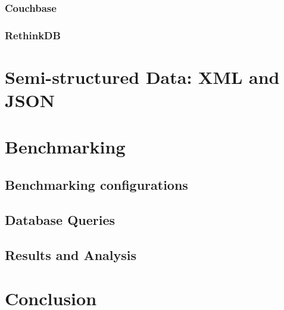 \documentclass[a4paper,12pt]{book}
\begin{document}
	\subsection{Couchbase}\label{intro-couchbase}
	    
	\subsection{RethinkDB}
        			
		
	\chapter{Semi-structured Data: XML and JSON}\label{semi-structure-data}
		
		
	\chapter{Benchmarking}\label{ch:benchmarking} %
	\section{Benchmarking configurations}
	
    \section{Database Queries}
        
    \section{Results and Analysis}
        
	\chapter{Conclusion}\label{conc} 
	    
\end{document}
